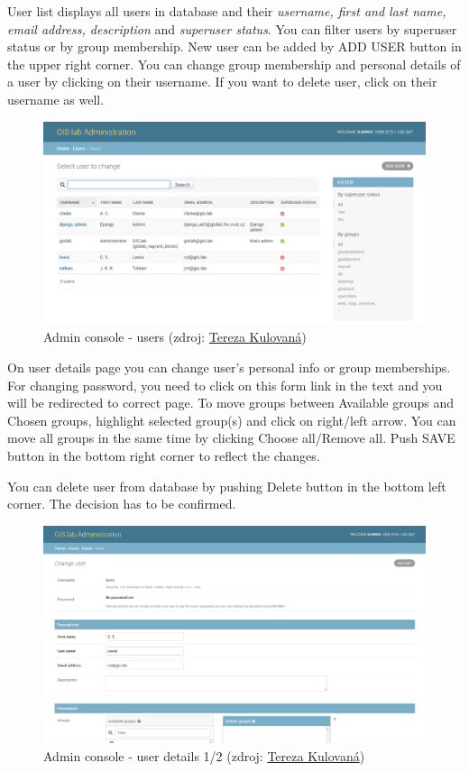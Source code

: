 User list displays all users in database and their \textit{username, first and last name, email address, description} and \textit{superuser status}. You can filter users by superuser status or by group membership. New user can be added by \textsf{ADD USER} button in the upper right corner. You can change group membership and personal details of a user by clicking on their username. If you want to delete user, click on their username as well.
\begin{figure}[H] \centering
    \includegraphics[width=430pt]{./prilohy/guide-admin-users.png}
    \caption[Admin console - users]{Admin console - users (zdroj:
	\href{}{Tereza Kulovaná})}
	\label{fig:guide-admin-users}
\end{figure}

On user details page you can change user's personal info or group memberships. For changing password, you need to click on \textsf{this form} link in the text and you will be redirected to correct page. To move groups between \textsf{Available groups} and \textsf{Chosen groups}, highlight selected group(s) and click on right/left arrow. You can move all groups in the same time by clicking \textsf{Choose all/Remove all}. Push \textsf{SAVE} button in the bottom right corner to reflect the changes.

You can delete user from database by pushing \textsf{Delete} button in the bottom left corner. The decision has to be confirmed.
\begin{figure}[H] \centering
    \includegraphics[width=430pt]{./prilohy/guide-admin-changeuser01.png}
    \caption[Admin console - user details 1/2]{Admin console - user details 1/2 (zdroj:
	\href{}{Tereza Kulovaná})}
	\label{fig:guide-admin-changeuser01}
\end{figure}

